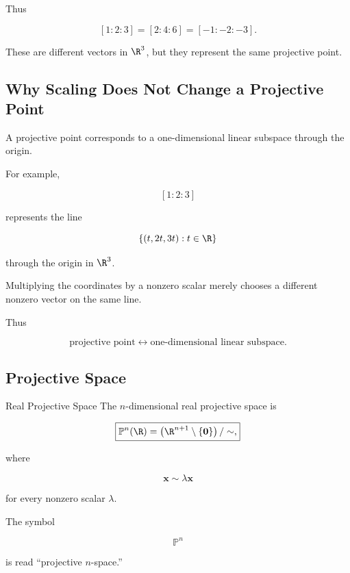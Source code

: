 Thus

\[
[1:2:3]
=
[2:4:6]
=
[-1:-2:-3].
\]

These are different vectors in \(\R^3\), but they represent the same
projective point.

\subsection{Why Scaling Does Not Change a Projective Point}
\label{subsec:projective-scaling-equivalence}

A projective point corresponds to a one-dimensional linear subspace through
the origin.

For example,

\[
[1:2:3]
\]

represents the line

\[
\{(t,2t,3t):t\in\R\}
\]

through the origin in \(\R^3\).

Multiplying the coordinates by a nonzero scalar merely chooses a different
nonzero vector on the same line.

Thus

\[
\boxed{
\text{projective point}
\longleftrightarrow
\text{one-dimensional linear subspace}.
}
\]

\subsection{Projective Space}
\label{subsec:projective-space}

\begin{definitionbox}{Real Projective Space}
The \(n\)-dimensional real projective space is

\[
\boxed{
\mathbb{P}^{n}(\R)
=
\left(\R^{n+1}\setminus\{\mathbf{0}\}\right)/\sim,
}
\]

where

\[
\mathbf{x}\sim\lambda\mathbf{x}
\]

for every nonzero scalar \(\lambda\).
\end{definitionbox}

The symbol

\[
\mathbb{P}^{n}
\]

is read ``projective \(n\)-space.''

